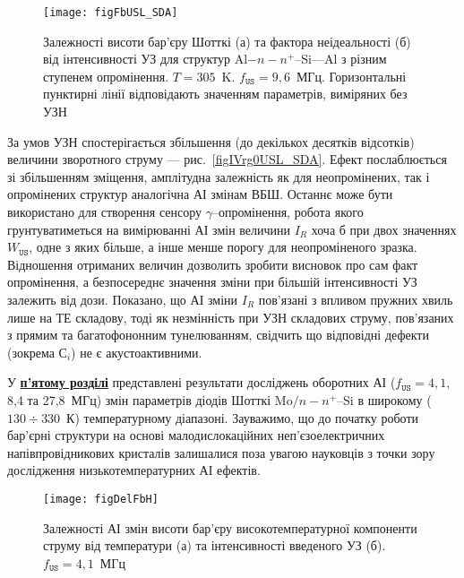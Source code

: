 \begin{figure}
\center
\texttt{[image: figFbUSL\_SDA]}
\caption{\label{figFbUSL_SDA}
Залежності висоти бар'єру Шотткі (а) та фактора неідеальності (б)  від інтенсивності УЗ для
структур Al$-n-n^+$--Si---Al з різним ступенем опромінення.
$T=305$~K.
$f_\mathtt{US}=9,6$~МГц.
Горизонтальні пунктирні лінії відповідають значенням параметрів, виміряних без УЗН
}%
\end{figure}

За умов УЗН спостерігається збільшення (до декількох десятків відсотків) величини зворотного струму --- рис.~\ref{figIVrg0USL_SDA}.
Ефект послаблюється зі збільшенням зміщення, амплітудна залежність як для неопромінених, так і опромінених структур аналогічна АІ змінам ВБШ.
Останнє може бути використано для створення сенсору $\gamma$--опромінення,
робота якого грунтуватиметься на вимірюванні АІ змін величини $I_R$ хоча б при двох значеннях $W_\mathtt{US}$,
одне з яких більше, а інше менше порогу для неопроміненого зразка.
Відношення отриманих величин дозволить зробити висновок про сам факт опромінення,
а безпосереднє значення зміни при більшій інтенсивності УЗ залежить від дози.
Показано, що АІ зміни $I_R$ пов'язані з впливом пружних хвиль лише на ТЕ складову,
тоді як незмінність при УЗН складових струму, пов’язаних з прямим та багатофононним тунелюванням,
свідчить що відповідні дефекти (зокрема С$_i$) не є акустоактивними.


У  \underline{\textbf{п'ятому розділі}} представлені результати досліджень
оборотних АІ ($f_\mathtt{US}=4,1$, 8,4 та 27,8~МГц) змін параметрів діодів Шотткі Mo$/n-n^+$--Si в широкому ($130\div330$~К) температурному діапазоні.
Зауважимо, що до початку роботи бар'єрні структури на основі малодислокаційних неп'єзоелектричних напівпровідникових кристалів
залишалися поза увагою науковців з точки зору дослідження низькотемпературних АІ ефектів.

\begin{figure}
\center
\texttt{[image: figDelFbH]}
\caption{\label{figDelFbH}
Залежності АІ змін висоти бар'єру високотемпературної компоненти струму від температури (а) та інтенсивності введеного УЗ (б).
$f_\mathtt{US}=4,1$~МГц
}%
\end{figure}

